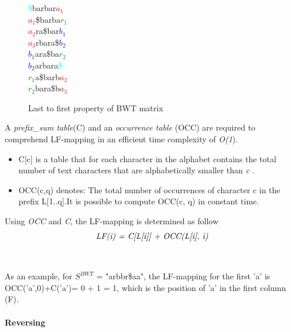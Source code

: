 \documentclass[11pt,a4paper]{report}
\begin{document}
\begin{figure}[H]
\centering
\textcolor{cyan}{\$}barbar\textcolor{red}{$a_1$}\\
\textcolor{red}{$a_1$}\$barba\textcolor{green}{$r_1$}\\
\textcolor{red}{$a_2$}ra\$bar\textcolor{blue}{$b_1$}\\
\textcolor{red}{$a_3$}rbara\$\textcolor{blue}{$b_2$}\\
\textcolor{blue}{$b_1$}ara\$ba\textcolor{green}{$r_2$}\\
\textcolor{blue}{$b_2$}arbara\textcolor{cyan}{\$}\\
\textcolor{green}{$r_1$}a\$barb\textcolor{red}{$a_2$}\\
\textcolor{green}{$r_2$}bara\$b\textcolor{red}{$a_3$}
 \caption{Last to first property of BWT matrix}
 \label{Lemma1}
\end{figure}

A \emph{prefix\_sum table}(C) and an \emph{occurrence table}
(OCC) are required to comprehend LF-mapping in an efficient time 
complexity of \emph{O(1}).\\

\begin{itemize}

	\item C[c] is a table that for each character in 
	the alphabet contains the total number of text 
	characters that are alphabetically smaller than
	 \emph{c} \cite{fmindex}.

	
	\item OCC(c,q) denotes:  The total number of 
	occurrences of character c in the prefix 
	L[1..q]\cite{fmindex}.It is possible to 
	compute OCC(c, q) in constant time.
	
\end{itemize}

Using \emph{OCC} and \emph{C}, the LF-mapping 
is determined as follow
$$\emph{LF(i) = C[L[i]] + OCC(L[i], i)}$$ \\\\

As an example, for $S^{BWT}$ = "arbbr\$aa", the LF-mapping
for the first 'a' is OCC('a',0)+C('a')= 0 + 1 = 1, which is 
the position of 'a' in the first column (F).





\paragraph{Reversing} \label{Reversing}
\end{document}
